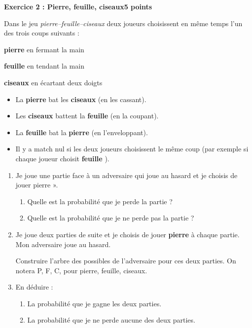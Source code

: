 \textbf{Exercice 2 : Pierre, feuille, ciseaux\hfill 5 points}

\medskip 

Dans le jeu \emph{pierre--feuille--ciseaux} deux joueurs choisissent en même temps l'un des trois \og  coups \fg{} suivants : 

\textbf{pierre} en fermant la main 

\textbf{feuille} en tendant la main 

\textbf{ciseaux} en écartant deux doigts 

\medskip
\begin{itemize}
\item La \textbf{pierre} bat les \textbf{ciseaux} (en les cassant). 
\item Les \textbf{ciseaux} battent la \textbf{feuille} (en la coupant). 
\item La \textbf{feuille} bat la \textbf{pierre} (en l'enveloppant). 
\item Il y a match nul si les deux joueurs choisissent le même coup (par exemple si chaque joueur choisit \og \textbf{feuille} \fg). 
\end{itemize}

\medskip

\begin{enumerate}
\item Je joue une partie face à un adversaire qui joue au hasard et je choisis de jouer \og pierre ». 
	\begin{enumerate}
		\item Quelle est la probabilité que je perde la partie ? 
		\item Quelle est la probabilité que je ne perde pas la partie ? 
	\end{enumerate}
\item  Je joue deux parties de suite et je choisis de jouer \og \textbf{pierre} \fg{} à chaque partie. Mon adversaire joue au hasard. 

Construire l'arbre des possibles de l'adversaire pour ces deux parties. On notera P,\: F,\: C, pour pierre, feuille, ciseaux. 

\item  En déduire : 
	\begin{enumerate}
		\item La probabilité que je gagne les deux parties. 
		\item La probabilité que je ne perde aucune des deux parties. 
	\end{enumerate}
\end{enumerate}

\vspace{0,5cm}

